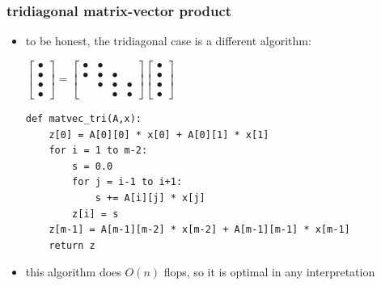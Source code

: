 \documentclass[10pt,
               svgnames,
               hyperref={colorlinks,citecolor=DeepPink4,linkcolor=FireBrick,urlcolor=Maroon},
               usepdftitle=false]{beamer}
\begin{document}
\newcommand{\bulletaxtri}{\begin{bmatrix} \bullet \\ \bullet \\ \bullet \\ \bullet \end{bmatrix} = \begin{bmatrix} \bullet & \bullet & & \\ \bullet & \bullet & \bullet & \\ & \bullet & \bullet & \bullet \\ & & \bullet & \bullet \end{bmatrix} \begin{bmatrix} \bullet \\ \bullet \\ \bullet \\ \bullet \end{bmatrix}}

\begin{frame}[fragile]
\frametitle{tridiagonal matrix-vector product}

\begin{itemize}
\item to be honest, the tridiagonal case is a different algorithm:

\bigskip

\hfill
{\scriptsize $\displaystyle \bulletaxtri$}

\begin{center}
\begin{minipage}{0.8\textwidth}
\begin{verbatim}
def matvec_tri(A,x):
    z[0] = A[0][0] * x[0] + A[0][1] * x[1]
    for i = 1 to m-2:
        s = 0.0
        for j = i-1 to i+1:
            s += A[i][j] * x[j]
        z[i] = s
    z[m-1] = A[m-1][m-2] * x[m-2] + A[m-1][m-1] * x[m-1]
    return z
\end{verbatim}
\end{minipage}
\end{center}

\bigskip
\item this algorithm does $O(n)$ flops, so it is optimal in any interpretation
\end{itemize}
\end{frame}
\end{document}
